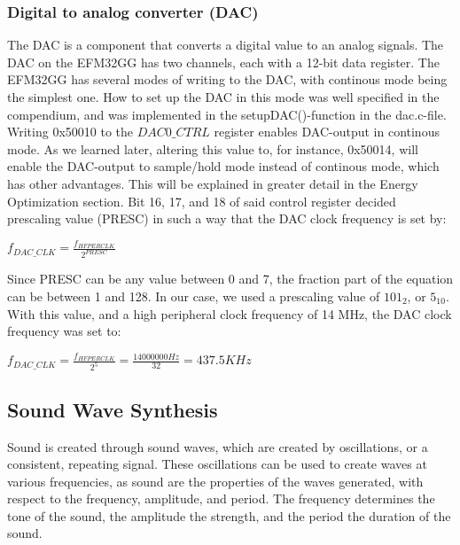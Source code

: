 \subsubsection{Digital to analog converter (DAC)}
The DAC is a component that converts a digital value to an analog signals. The DAC on the EFM32GG has two channels, each with a 12-bit data register. The EFM32GG has several modes of writing to the DAC, with continous mode being the simplest one. How to set up the DAC in this mode was well specified in the compendium, and was implemented in the setupDAC()-function in the dac.c-file. Writing 0x50010 to the $DAC0\_CTRL$ register enables DAC-output in continous mode. As we learned later, altering  this value to, for instance, 0x50014, will enable the DAC-output to sample/hold mode instead of continous mode, which has other advantages. This will be explained in greater detail in the Energy Optimization section. 
	Bit 16, 17, and 18 of said control register decided prescaling value (PRESC) in such a way that the DAC clock frequency is set by:

\begin{center}

$f_{DAC\_CLK} = \frac{f_{HFPERCLK}}{2^{PRESC}}$

\end{center}

Since PRESC can be any value between 0 and 7, the fraction part of the equation can be between 1 and 128. In our case, we used a prescaling value of $101_2$, or $5_{10}$. With this value, and a high peripheral clock frequency of 14 MHz, the DAC clock frequency was set to:

\begin{center}

$f_{DAC\_CLK} = \frac{f_{HFPERCLK}}{2^{5}} = \frac{14000000 Hz}{32} = 437.5 KHz $

\end{center}

\subsection{Sound Wave Synthesis}

Sound is created through sound waves, which are created by oscillations, or a consistent, repeating signal. These oscillations can be used to create waves at various frequencies, as sound are the properties of the waves generated, with respect to the frequency, amplitude, and period. The frequency determines the tone of the sound, the amplitude the strength, and the period the duration of the sound.

